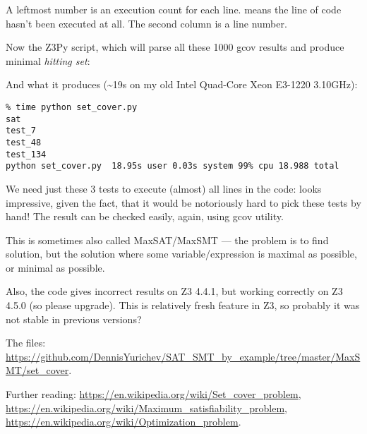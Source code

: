 A leftmost number is an execution count for each line.
\TT{\#\#\#\#\#} means the line of code hasn't been executed at all.
The second column is a line number.

Now the Z3Py script, which will parse all these 1000 gcov results and produce minimal \emph{hitting set}:



And what it produces (\textasciitilde{}19s on my old Intel Quad-Core Xeon E3-1220 3.10GHz):

\begin{lstlisting}
% time python set_cover.py
sat
test_7
test_48
test_134
python set_cover.py  18.95s user 0.03s system 99% cpu 18.988 total
\end{lstlisting}

We need just these 3 tests to execute (almost) all lines in the code:
looks impressive, given the fact, that it would be notoriously hard to pick these tests by hand!
The result can be checked easily, again, using gcov utility.

This is sometimes also called MaxSAT/MaxSMT --- the problem is to find solution,
but the solution where some variable/expression is maximal as possible, or minimal as possible.

Also, the code gives incorrect results on Z3 4.4.1, but working correctly on Z3 4.5.0 (so please upgrade).
This is relatively fresh feature in Z3, so probably it was not stable in previous versions?

The files: \url{https://github.com/DennisYurichev/SAT_SMT_by_example/tree/master/MaxSMT/set_cover}.

Further reading:
\url{https://en.wikipedia.org/wiki/Set_cover_problem},
\url{https://en.wikipedia.org/wiki/Maximum_satisfiability_problem},
\url{https://en.wikipedia.org/wiki/Optimization_problem}.

